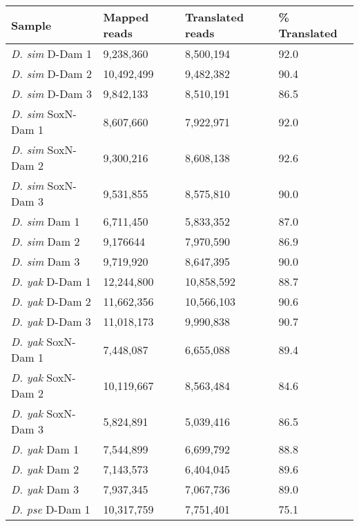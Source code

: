\begin{table}[H]
\centering
\begin{tabular}{|l|l|l|l|}
\hline
\textbf{Sample}            & \textbf{Mapped reads} & \textbf{Translated reads} & \textbf{\% Translated} \\ \hline
\emph{D. sim} D-Dam 1    & 9,238,360    & 8,500,194        & 92.0            \\ \hline
\emph{D. sim} D-Dam 2    & 10,492,499   & 9,482,382        & 90.4          \\ \hline
\emph{D. sim} D-Dam 3    & 9,842,133    & 8,510,191        & 86.5          \\ \hline
\emph{D. sim} SoxN-Dam 1 & 8,607,660    & 7,922,971        & 92.0            \\ \hline
\emph{D. sim} SoxN-Dam 2 & 9,300,216    & 8,608,138        & 92.6          \\ \hline
\emph{D. sim} SoxN-Dam 3 & 9,531,855    & 8,575,810        & 90.0            \\ \hline
\emph{D. sim} Dam 1      & 6,711,450    & 5,833,352        & 87.0            \\ \hline
\emph{D. sim} Dam 2      & 9,176644     & 7,970,590        & 86.9          \\ \hline
\emph{D. sim} Dam 3      & 9,719,920    & 8,647,395        & 90.0            \\ \hline
\emph{D. yak} D-Dam 1    & 12,244,800   & 10,858,592       & 88.7          \\ \hline
\emph{D. yak} D-Dam 2    & 11,662,356   & 10,566,103       & 90.6          \\ \hline
\emph{D. yak} D-Dam 3    & 11,018,173   & 9,990,838        & 90.7          \\ \hline
\emph{D. yak} SoxN-Dam 1 & 7,448,087    & 6,655,088        & 89.4          \\ \hline
\emph{D. yak} SoxN-Dam 2 & 10,119,667   & 8,563,484        & 84.6          \\ \hline
\emph{D. yak} SoxN-Dam 3 & 5,824,891    & 5,039,416        & 86.5          \\ \hline
\emph{D. yak} Dam 1      & 7,544,899    & 6,699,792        & 88.8          \\ \hline
\emph{D. yak} Dam 2      & 7,143,573    & 6,404,045        & 89.6          \\ \hline
\emph{D. yak} Dam 3      & 7,937,345    & 7,067,736        & 89.0            \\ \hline
\emph{D. pse} D-Dam 1    & 10,317,759   & 7,751,401        & 75.1          \\ \hline

\end{tabular}
\end{table}
